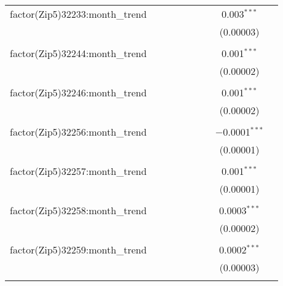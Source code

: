 \begin{table}[H]
{\begin{tabular}{@{\extracolsep{5pt}}lcccccccc}
  factor(Zip5)32233:month\_trend &  &  &  &  &  &  & 0.003$^{***}$ &  \\  

   &  &  &  &  &  &  & (0.00003) &  \\  

   & & & & & & & & \\  

  factor(Zip5)32244:month\_trend &  &  &  &  &  &  & 0.001$^{***}$ &  \\  

   &  &  &  &  &  &  & (0.00002) &  \\  

   & & & & & & & & \\  

  factor(Zip5)32246:month\_trend &  &  &  &  &  &  & 0.001$^{***}$ &  \\  

   &  &  &  &  &  &  & (0.00002) &  \\  

   & & & & & & & & \\  

  factor(Zip5)32256:month\_trend &  &  &  &  &  &  & $-$0.0001$^{***}$ &  \\  

   &  &  &  &  &  &  & (0.00001) &  \\  

   & & & & & & & & \\  

  factor(Zip5)32257:month\_trend &  &  &  &  &  &  & 0.001$^{***}$ &  \\  

   &  &  &  &  &  &  & (0.00001) &  \\  

   & & & & & & & & \\  

  factor(Zip5)32258:month\_trend &  &  &  &  &  &  & 0.0003$^{***}$ &  \\  

   &  &  &  &  &  &  & (0.00002) &  \\  

   & & & & & & & & \\  

  factor(Zip5)32259:month\_trend &  &  &  &  &  &  & 0.0002$^{***}$ &  \\  

   &  &  &  &  &  &  & (0.00003) &  \\  

   & & & & & & & & \\  


\end{tabular}}
\end{table}
